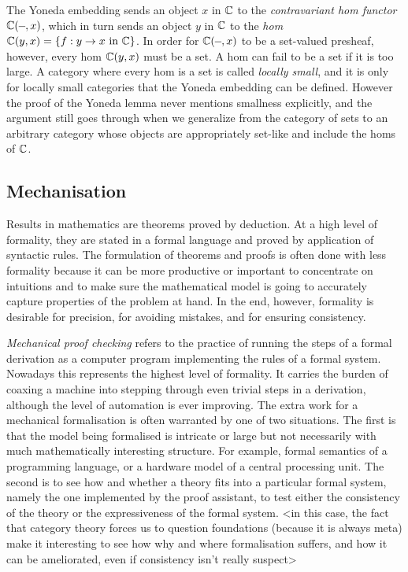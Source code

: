 \documentclass[twoside,titlepage,11pt]{article}
\begin{document}
The Yoneda embedding sends an object $x$ in $\mathbb{C}$ to the \emph{contravariant hom functor} $\C(\blank,x)$, which in turn sends an object $y$ in $\mathbb{C}$ to the \emph{hom} $\mathbb{C}(y,x)=\{f:y\to x\text{ in $\mathbb{C}$}\}$.
In order for $\C(\blank,x)$ to be a set-valued presheaf, however, every hom $\mathbb{C}(y,x)$ must be a set.
A hom can fail to be a set if it is too large.
A category where every hom is a set is called \emph{locally small}, and it is only for locally small categories that the Yoneda embedding can be defined.
However the proof of the Yoneda lemma never mentions smallness explicitly, and the argument still goes through when we generalize from the category of sets to an arbitrary category whose objects are appropriately set-like and include the homs of $\mathbb{C}$.
\subsection{Mechanisation}%
Results in mathematics are theorems proved by deduction.
At a high level of formality, they are stated in a formal language and proved by application of syntactic rules.
The formulation of theorems and proofs is often done with less formality because it can be more productive or important to concentrate on intuitions and to make sure the mathematical model is going to accurately capture properties of the problem at hand.
In the end, however, formality is desirable for precision, for avoiding mistakes, and for ensuring consistency.%

\emph{Mechanical proof checking} refers to the practice of running the steps of a formal derivation as a computer program implementing the rules of a formal system.
Nowadays this represents the highest level of formality.
It carries the burden of coaxing a machine into stepping through even trivial steps in a derivation, although the level of automation is ever improving.
The extra work for a mechanical formalisation is often warranted by one of two situations.
The first is that the model being formalised is intricate or large but not necessarily with much mathematically interesting structure.
For example, formal semantics of a programming language, or a hardware model of a central processing unit.
The second is to see how and whether a theory fits into a particular formal system, namely the one implemented by the proof assistant, to test either the consistency of the theory or the expressiveness of the formal system.
<in this case, the fact that category theory forces us to question foundations (because it is always meta) make it interesting to see how why and where formalisation suffers, and how it can be ameliorated, even if consistency isn't really suspect>%
\end{document}
